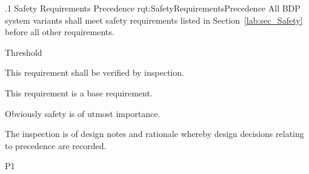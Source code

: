 \ONERQMTV
{\RqtNumberBase.1}
{Safety Requirements Precedence}
{rqt:SafetyRequirementsPrecedence}
{All BDP system variants shall meet safety requirements listed in Section~\ref{lab:sec_Safety} before all other requirements.}
{
	\item [Phase 1] Threshold
}
{This requirement shall be verified by inspection.}
{
	\item [N/A] This requirement is a base requirement.
}
{
	\item Obviously safety is of utmost importance.
	\item The inspection is of design notes and rationale whereby design decisions relating to precedence are recorded.
}
{P1}

